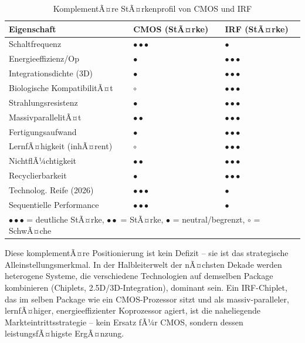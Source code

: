 ﻿\documentclass[a4paper,12pt]{scrreprt}
\theoremstyle{definition}
\begin{document}
\begin{table}[H]
	\centering
	\caption{KomplementÃ¤re StÃ¤rkenprofil von CMOS und IRF}
	\label{tab:abschluss_vergleich}
	\begin{tabular}{p{5.5cm}p{4cm}p{4cm}}
		\toprule
		\textbf{Eigenschaft} & \textbf{CMOS (StÃ¤rke)} & \textbf{IRF (StÃ¤rke)} \\
		\midrule
		Schaltfrequenz              & $\bullet\bullet\bullet$ & $\bullet$ \\
		Energieeffizienz/Op         & $\bullet$               & $\bullet\bullet\bullet$ \\
		Integrationsdichte (3D)     & $\bullet$               & $\bullet\bullet\bullet$ \\
		Biologische KompatibilitÃ¤t  & $\circ$                 & $\bullet\bullet\bullet$ \\
		Strahlungsresistenz         & $\bullet$               & $\bullet\bullet\bullet$ \\
		MassivparallelitÃ¤t          & $\bullet\bullet$        & $\bullet\bullet\bullet$ \\
		Fertigungsaufwand           & $\bullet$               & $\bullet\bullet\bullet$ \\
		LernfÃ¤higkeit (inhÃ¤rent)    & $\circ$                 & $\bullet\bullet\bullet$ \\
		NichtflÃ¼chtigkeit           & $\bullet\bullet$        & $\bullet\bullet\bullet$ \\
		Recyclierbarkeit            & $\bullet$               & $\bullet\bullet\bullet$ \\
		Technolog. Reife (2026)     & $\bullet\bullet\bullet$ & $\bullet$ \\
		Sequentielle Performance    & $\bullet\bullet\bullet$ & $\bullet$ \\
		\bottomrule
		\multicolumn{3}{l}{\small $\bullet\bullet\bullet$ = deutliche StÃ¤rke, $\bullet\bullet$ = StÃ¤rke,
			$\bullet$ = neutral/begrenzt, $\circ$ = SchwÃ¤che}
	\end{tabular}
\end{table}

Diese komplementÃ¤re Positionierung ist kein Defizit -- sie ist das
strategische Alleinstellungsmerkmal. In der Halbleiterwelt der
nÃ¤chsten Dekade werden heterogene Systeme, die verschiedene
Technologien auf demselben Package kombinieren (Chiplets,
2.5D/3D-Integration), dominant sein. Ein IRF-Chiplet,
das im selben Package wie ein CMOS-Prozessor sitzt und als
massiv-paralleler, lernfÃ¤higer, energieeffizienter Koprozessor agiert,
ist die naheliegende Markteintrittsstrategie -- kein Ersatz
fÃ¼r CMOS, sondern dessen leistungsfÃ¤higste ErgÃ¤nzung.
\end{document}
